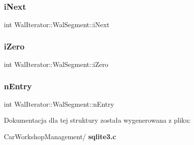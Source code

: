 \subsubsection{iNext}
{\footnotesize\ttfamily int Wal\+Iterator\+::\+Wal\+Segment\+::i\+Next}

\mbox{\label{struct_wal_iterator_1_1_wal_segment_a3eedec5e8e8dd94be670d50ac144a959}} 
\subsubsection{iZero}
{\footnotesize\ttfamily int Wal\+Iterator\+::\+Wal\+Segment\+::i\+Zero}

\mbox{\label{struct_wal_iterator_1_1_wal_segment_ad80cf479aa670eda7aa1adee607af7d9}} 
\subsubsection{nEntry}
{\footnotesize\ttfamily int Wal\+Iterator\+::\+Wal\+Segment\+::n\+Entry}



Dokumentacja dla tej struktury została wygenerowana z pliku\+:\begin{DoxyCompactItemize}
\item 
Car\+Workshop\+Management/\textbf{ sqlite3.\+c}\end{DoxyCompactItemize}
